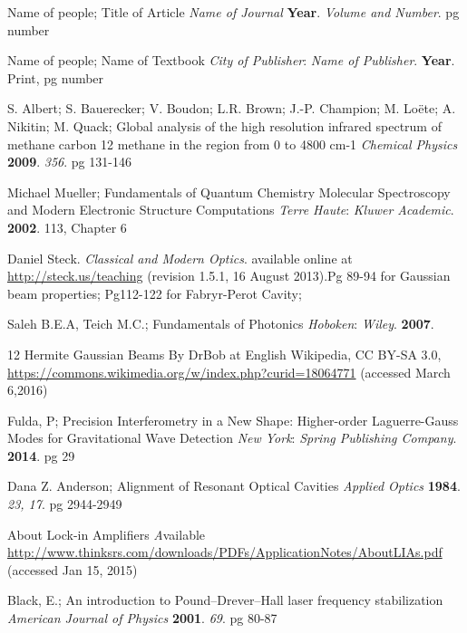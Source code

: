 \begin{thebibliography}{9}

		Name of people;
		Title of Article
		\textit{Name of Journal}
		\textbf{Year}.
		\textit{Volume and Number}.
		pg number
	
	
		Name of people;
		Name of Textbook
		\textit{City of Publisher}:
		\textit{Name of Publisher}.
		\textbf{Year}.
		Print,
		pg number
	
		S. Albert; S. Bauerecker; V. Boudon; L.R. Brown; J.-P. Champion; M. Loëte; A. Nikitin; M. Quack;
		Global analysis of the high resolution infrared spectrum of methane carbon 12
		methane in the region from 0 to 4800 cm-1
		\textit{Chemical Physics}
		\textbf{2009}.
		\textit{356}.
		pg 131-146	
	
	
		Michael Mueller;
		Fundamentals of Quantum Chemistry Molecular Spectroscopy and Modern Electronic Structure Computations
		\textit{Terre Haute}:
		\textit{Kluwer Academic}.
		\textbf{2002}.
		113, Chapter 6
	
	
		Daniel Steck. 
		\textit{Classical and Modern Optics}. 
		available online at \url{http://steck.us/teaching} (revision
		1.5.1, 16 August 2013).Pg 89-94 for Gaussian beam properties; Pg112-122 for Fabryr-Perot Cavity;
		
		Saleh B.E.A, Teich M.C.;
		Fundamentals of Photonics
		\textit{Hoboken}:
		\textit{Wiley}.
		\textbf{2007}.
		
	
		12 Hermite Gaussian Beams	
		By DrBob at English Wikipedia, CC BY-SA 3.0, \url{https://commons.wikimedia.org/w/index.php?curid=18064771}
		(accessed March 6,2016)
		
	
		Fulda, P;
		Precision Interferometry in a New Shape: Higher-order Laguerre-Gauss Modes for Gravitational Wave Detection
		\textit{New York}:
		\textit{Spring Publishing Company}.
		\textbf{2014}.
		pg 29		
		
	
		Dana Z. Anderson;
		Alignment of Resonant Optical Cavities
		\textit{Applied Optics}
		\textbf{1984}.
		\textit{23, 17}.
		pg 2944-2949
		
	
		About Lock-in Amplifiers
		\textit
		Available \url{http://www.thinksrs.com/downloads/PDFs/ApplicationNotes/AboutLIAs.pdf}
		(accessed Jan 15, 2015)
		
		
		Black, E.;
		An introduction to Pound–Drever–Hall laser frequency stabilization
		\textit{American Journal of Physics}
		\textbf{2001}.
		\textit{69}.
		pg 80-87
		

\end{thebibliography}
